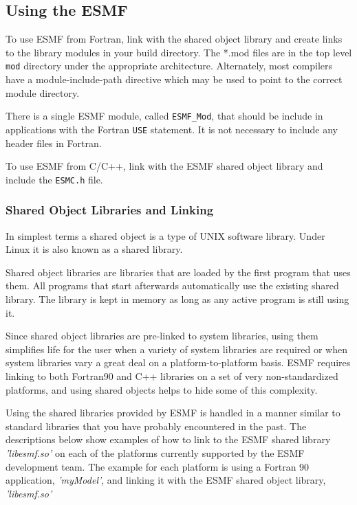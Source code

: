 
\subsection{Using the ESMF}
\label{UsingLibrary}

To use ESMF from Fortran, link with the shared object library and
create links to the library modules in your build directory.  The
*.mod files are
in the top level {\tt mod} directory under the appropriate architecture.  
Alternately, most compilers have a module-include-path directive which 
may be used to point to the correct module directory.

There is a single ESMF module, called {\tt ESMF_Mod}, that should be 
include in applications with the Fortran {\tt USE} statement.  It 
is not necessary to include any header files in Fortran.

To use ESMF from C/C++, link with the ESMF shared object library 
and include the {\tt ESMC.h} file.

\subsubsection{Shared Object Libraries and Linking}

In simplest terms a shared object is a type of UNIX software library. 
Under Linux it is also known as a shared library. 

Shared object libraries are libraries that are loaded by the first program that uses them. All programs that start afterwards automatically use the existing shared library. The library is kept in memory as long as any active program is still using it. 

Since shared object libraries are pre-linked to system libraries, using them
simplifies life for the user when a variety of system libraries are
required or when system libraries vary a great deal on a 
platform-to-platform basis.  ESMF requires linking to both Fortran90 and
C++ libraries on a set of very non-standardized platforms, and using
shared objects helps to hide some of this complexity.

Using the shared libraries provided by ESMF is handled in a manner similar to standard libraries that you have probably encountered in the past. The descriptions below show examples of how to link to the ESMF shared library \emph{'libesmf.so'} on each of the platforms currently supported by the ESMF development team. The example for each platform is using a Fortran 90 application, \emph{'myModel'}, and linking it with the ESMF shared object library, \emph{'libesmf.so'}

